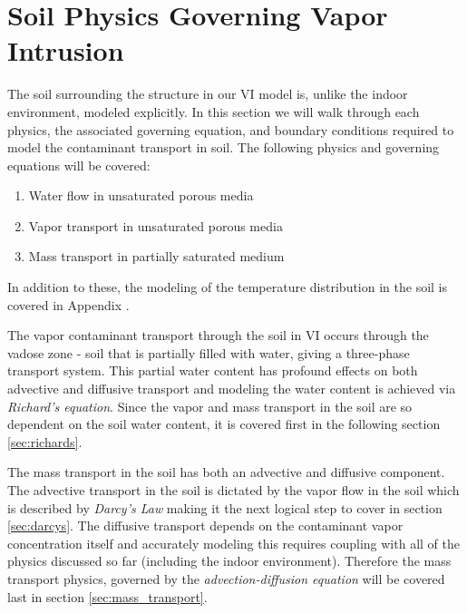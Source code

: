 \section{Soil Physics Governing Vapor Intrusion}\label{sec:soil_domain}

The soil surrounding the structure in our VI model is, unlike the indoor environment, modeled explicitly.
In this section we will walk through each physics, the associated governing equation, and boundary conditions required to model the contaminant transport in soil.
The following physics and governing equations will be covered:
\begin{enumerate}
  \item Water flow in unsaturated porous media
  \item Vapor transport in unsaturated porous media
  \item Mass transport in partially saturated medium
\end{enumerate}
In addition to these, the modeling of the temperature distribution in the soil is covered in Appendix .\par %

The vapor contaminant transport through the soil in VI occurs through the vadose zone - soil that is partially filled with water, giving a three-phase transport system.
This partial water content has profound effects on both advective and diffusive transport and modeling the water content is achieved via \textit{Richard's equation}.
Since the vapor and mass transport in the soil are so dependent on the soil water content, it is covered first in the following section \ref{sec:richards}.\par

The mass transport in the soil has both an advective and diffusive component.
The advective transport in the soil is dictated by the vapor flow in the soil which is described by \textit{Darcy's Law} making it the next logical step to cover in section \ref{sec:darcys}.
The diffusive transport depends on the contaminant vapor concentration itself and accurately modeling this requires coupling with all of the physics discussed so far (including the indoor environment).
Therefore the mass transport physics, governed by the \textit{advection-diffusion equation} will be covered last in section \ref{sec:mass_transport}.\par 




